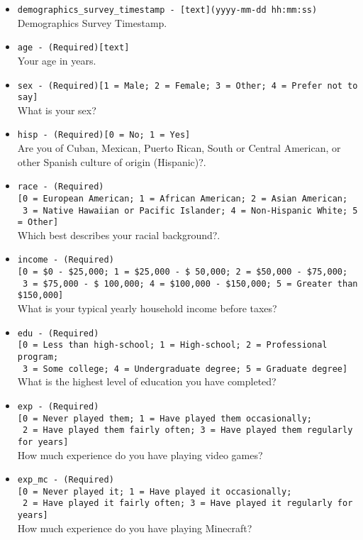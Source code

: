 \begin{description}
\begin{addmargin}[0em]{0em}
\begin{addmargin}[1em]{0em}
\begin{itemize}
            \item \verb|demographics_survey_timestamp - [text](yyyy-mm-dd hh:mm:ss)|\\Demographics Survey Timestamp.
            \item \verb|age - (Required)[text]|\\Your age in years.
            \item \verb|sex - (Required)[1 = Male; 2 = Female; 3 = Other; 4 = Prefer not to say]|\\What is your sex?
            \item \verb|hisp - (Required)[0 = No; 1 = Yes]|\\Are you of Cuban, Mexican, Puerto Rican, South or Central American, or other Spanish culture of origin (Hispanic)?.
            \item \verb|race - (Required)|\\\verb|[0 = European American; 1 = African American; 2 = Asian American;|\\\verb| 3 = Native Hawaiian or Pacific Islander; 4 = Non-Hispanic White; 5 = Other]|\\Which best describes your racial background?.
            \item \verb|income - (Required)|\\\verb|[0 = $0 - $25,000; 1 = $25,000 - $ 50,000; 2 = $50,000 - $75,000;|\\\verb| 3 = $75,000 - $ 100,000; 4 = $100,000 - $150,000; 5 = Greater than $150,000]|\\What is your typical yearly household income before taxes?
            \item \verb|edu - (Required)|\\\verb|[0 = Less than high-school; 1 = High-school; 2 = Professional program;|\\\verb| 3 = Some college; 4 = Undergraduate degree; 5 = Graduate degree]|\\What is the highest level of education you have completed?
            \item \verb|exp - (Required)|\\\verb|[0 = Never played them; 1 = Have played them occasionally;|\\\verb| 2 = Have played them fairly often; 3 = Have played them regularly for years]|\\How much experience do you have playing video games?
            \item \verb|exp_mc - (Required)|\\\verb|[0 = Never played it; 1 = Have played it occasionally;|\\\verb| 2 = Have played it fairly often; 3 = Have played it regularly for years]|\\How much experience do you have playing Minecraft?

\end{itemize}
\end{addmargin}
\end{addmargin}
\end{description}
